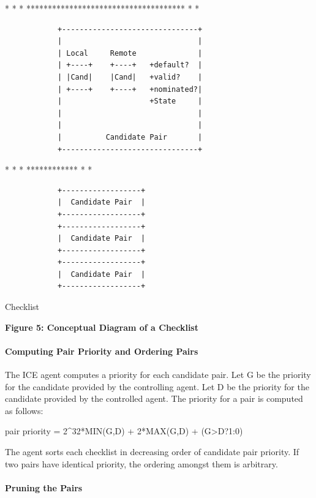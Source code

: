 \documentclass{article}
\begin{document}
*                                         * *    ************************************* *    *

\begin{verbatim}
            +-------------------------------+
            |                               |
            | Local     Remote              |
            | +----+    +----+   +default?  |
            | |Cand|    |Cand|   +valid?    |
            | +----+    +----+   +nominated?|
            |                    +State     |
            |                               |
            |                               |
            |          Candidate Pair       |
            +-------------------------------+
\end{verbatim}

*                              * *                  ************ *                  *

\begin{verbatim}
            +------------------+
            |  Candidate Pair  |
            +------------------+
            +------------------+
            |  Candidate Pair  |
            +------------------+
            +------------------+
            |  Candidate Pair  |
            +------------------+
\end{verbatim}

Checklist

\begin{center}
\textbf{Figure 5: Conceptual Diagram of a Checklist}
\end{center}

\paragraph{Computing Pair Priority and Ordering Pairs}

The ICE agent computes a priority for each candidate pair.  Let G be the priority for the candidate provided by the controlling agent. Let D be the priority for the candidate provided by the controlled agent.  The priority for a pair is computed as follows:

pair priority = 2\textasciicircum{}32*MIN(G,D) + 2*MAX(G,D) + (G>D?1:0)

The agent sorts each checklist in decreasing order of candidate pair priority.  If two pairs have identical priority, the ordering amongst them is arbitrary.

\paragraph{Pruning the Pairs}
\end{document}
